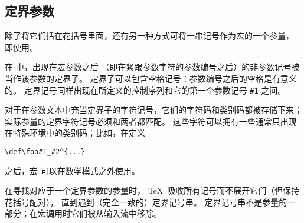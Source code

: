 \documentclass[letterpaper]{book}
\begin{document}
\subsection{定界参数}

除了将它们括在花括号里面，还有另一种方式可将一串记号作为宏的一个参量，
即使用。

在  中，出现在宏参数之后%
（即在紧跟参数字符的参数编号之后）的非参数记号被当作该参数的定界子。
定界子可以包含空格记号：参数编号之后的空格是有意义的。
定界记号同样出现在所定义的控制序列和它的第一个参数记号 \verb>#1> 之间。

对于在参数文本中充当定界子的字符记号，它们的字符码和类别码都被存储下来；
实际参量的定界字符记号必须和两者都匹配。
这些字符可以拥有一些通常只出现在特殊环境中的类别码；比如，在定义
\begin{verbatim}
\def\foo#1_#2^{...}
\end{verbatim}
之后，宏  可以在数学模式之外使用。

在寻找对应于一个定界参数的参量时，
\TeX\ 吸收所有记号而不展开它们（但保持花括号配对），
直到遇到（完全一致的）定界记号串。
定界记号串不是参量的一部分；在宏调用时它们被从输入流中移除。
\end{document}
